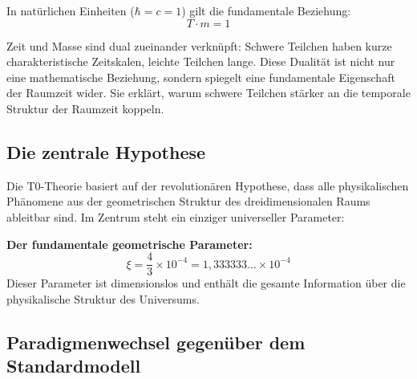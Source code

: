 	In natürlichen Einheiten ($\hbar = c = 1$) gilt die fundamentale Beziehung:
	\begin{equation}
		T \cdot m = 1
		\label{eq:time_mass_duality}
	\end{equation}
	
	Zeit und Masse sind dual zueinander verknüpft: Schwere Teilchen haben kurze charakteristische Zeitskalen, leichte Teilchen lange. Diese Dualität ist nicht nur eine mathematische Beziehung, sondern spiegelt eine fundamentale Eigenschaft der Raumzeit wider. Sie erklärt, warum schwere Teilchen stärker an die temporale Struktur der Raumzeit koppeln.
	
	\subsection{Die zentrale Hypothese}
	
	Die T0-Theorie basiert auf der revolutionären Hypothese, dass alle physikalischen Phänomene aus der geometrischen Struktur des dreidimensionalen Raums ableitbar sind. Im Zentrum steht ein einziger universeller Parameter:
	
	\begin{foundation}
		\textbf{Der fundamentale geometrische Parameter:}
		\begin{equation}
			\boxed{\xi = \frac{4}{3} \times 10^{-4} = 1{,}333333\dots \times 10^{-4}}
			\label{eq:xi_fundamental}
		\end{equation}
		Dieser Parameter ist dimensionslos und enthält die gesamte Information über die physikalische Struktur des Universums.
	\end{foundation}
	
	\subsection{Paradigmenwechsel gegenüber dem Standardmodell}
	
	\begin{table}[htbp]
		\centering
		\caption{Vergleich zwischen Standardmodell und T0-Theorie}
	\end{table}
	
